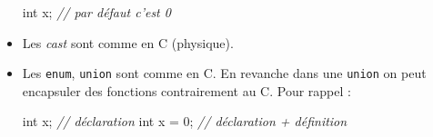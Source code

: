 \documentclass[]{article}
\newenvironment{Shaded}{}{}
\newcommand{\DataTypeTok}[1]{\textcolor[rgb]{0.56,0.13,0.00}{#1}}
\newcommand{\DecValTok}[1]{\textcolor[rgb]{0.25,0.63,0.44}{#1}}
\newcommand{\CommentTok}[1]{\textcolor[rgb]{0.38,0.63,0.69}{\textit{#1}}}
\newcommand{\NormalTok}[1]{#1}
\begin{document}
\begin{itemize}
\begin{Shaded}
\begin{Highlighting}[]
\DataTypeTok{int}\NormalTok{ x; }\CommentTok{// par défaut c'est 0}
\end{Highlighting}
\end{Shaded}
\item
  Les \emph{cast} sont comme en C (physique).
\item
  Les \texttt{enum}, \texttt{union} sont comme en C. En revanche dans
  une \texttt{union} on peut encapsuler des fonctions contrairement au
  C. Pour rappel :

\begin{Shaded}
\begin{Highlighting}[]
\DataTypeTok{int}\NormalTok{ x; }\CommentTok{// déclaration}
\DataTypeTok{int}\NormalTok{ x = }\DecValTok{0}\NormalTok{; }\CommentTok{// déclaration + définition}
\end{Highlighting}
\end{Shaded}
\end{itemize}
\end{document}
